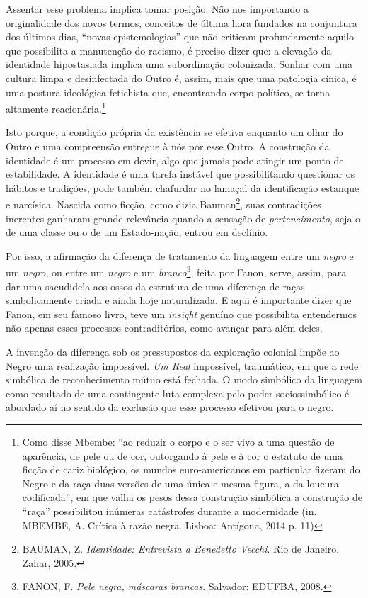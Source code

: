 Assentar esse problema implica tomar posição. Não nos importando a
originalidade dos novos termos, conceitos de última hora fundados na
conjuntura dos últimos dias, ``novas epistemologias'' que não criticam
profundamente aquilo que possibilita a manutenção do racismo, é preciso
dizer que: a elevação da identidade hipostasiada implica uma
subordinação colonizada. Sonhar com uma cultura limpa e desinfectada do
Outro é, assim, mais que uma patologia cínica, é uma postura ideológica
fetichista que, encontrando corpo político, se torna altamente
reacionária.\footnote{Como disse Mbembe: ``ao reduzir o corpo e o ser
  vivo a uma questão de aparência, de pele ou de cor, outorgando à pele
  e à cor o estatuto de uma ficção de cariz biológico, os mundos
  euro-americanos em particular fizeram do Negro e da raça duas versões
  de uma única e mesma figura, a da loucura codificada'', em que valha
  os pesos dessa construção simbólica a construção de ``raça''
  possibilitou inúmeras catástrofes durante a modernidade (in. MBEMBE,
  A. Crítica à razão negra. Lisboa: Antígona, 2014 p. 11)}

Isto porque, a condição própria da existência se efetiva enquanto um
olhar do Outro e uma compreensão entregue à nós por esse Outro. A
construção da identidade é um processo em devir, algo que jamais pode
atingir um ponto de estabilidade. A identidade é uma tarefa instável que
possibilitando questionar os hábitos e tradições, pode também chafurdar
no lamaçal da identificação estanque e narcísica. Nascida como ficção,
como dizia Bauman\footnote{BAUMAN, Z. \emph{Identidade: Entrevista a
  Benedetto Vecchi}. Rio de Janeiro, Zahar, 2005.}, suas contradições
inerentes ganharam grande relevância quando a sensação de
\emph{pertencimento}, seja o de uma classe ou o de um Estado-nação,
entrou em declínio.

Por isso, a afirmação da diferença de tratamento da linguagem entre um
\emph{negro} e um \emph{negro}, ou entre um \emph{negro} e um
\emph{branco}\footnote{FANON, F. \emph{Pele negra, máscaras brancas}.
  Salvador: EDUFBA, 2008.}, feita por Fanon, serve, assim, para dar uma
sacudidela aos ossos da estrutura de uma diferença de raças
simbolicamente criada e ainda hoje naturalizada. E aqui é importante
dizer que Fanon, em seu famoso livro, teve um \emph{insight} genuíno que
possibilita entendermos não apenas esses processos contraditórios, como
avançar para além deles.

A invenção da diferença sob os pressupostos da exploração colonial impõe
ao Negro uma realização impossível. \emph{Um Real} impossível,
traumático, em que a rede simbólica de reconhecimento mútuo está
fechada. O modo simbólico da linguagem como resultado de uma contingente
luta complexa pelo poder sociossimbólico é abordado aí no sentido da
exclusão que esse processo efetivou para o negro.

